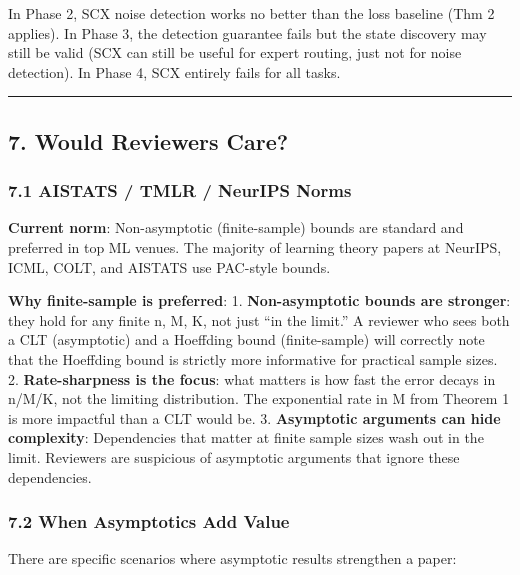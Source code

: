 \documentclass[
  12pt,
]{article}
\begin{document}
In Phase 2, SCX noise detection works no better than the loss baseline
(Thm 2 applies). In Phase 3, the detection guarantee fails but the state
discovery may still be valid (SCX can still be useful for expert
routing, just not for noise detection). In Phase 4, SCX entirely fails
for all tasks.

\begin{center}\rule{0.5\linewidth}{0.5pt}\end{center}

\subsection{7. Would Reviewers Care?}\label{would-reviewers-care}

\subsubsection{7.1 AISTATS / TMLR / NeurIPS
Norms}\label{aistats-tmlr-neurips-norms}

\textbf{Current norm}: Non-asymptotic (finite-sample) bounds are
standard and preferred in top ML venues. The majority of learning theory
papers at NeurIPS, ICML, COLT, and AISTATS use PAC-style bounds.

\textbf{Why finite-sample is preferred}: 1. \textbf{Non-asymptotic
bounds are stronger}: they hold for any finite n, M, K, not just ``in
the limit.'' A reviewer who sees both a CLT (asymptotic) and a Hoeffding
bound (finite-sample) will correctly note that the Hoeffding bound is
strictly more informative for practical sample sizes. 2.
\textbf{Rate-sharpness is the focus}: what matters is how fast the error
decays in n/M/K, not the limiting distribution. The exponential rate in
M from Theorem 1 is more impactful than a CLT would be. 3.
\textbf{Asymptotic arguments can hide complexity}: Dependencies that
matter at finite sample sizes wash out in the limit. Reviewers are
suspicious of asymptotic arguments that ignore these dependencies.

\subsubsection{7.2 When Asymptotics Add
Value}\label{when-asymptotics-add-value}

There are specific scenarios where asymptotic results strengthen a
paper:
\end{document}
